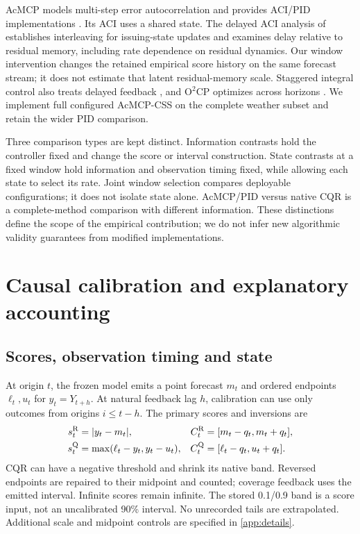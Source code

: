 AcMCP models multi-step error autocorrelation and provides ACI/PID implementations
\citep{wang2026acmcp}. Its ACI uses a shared state. The delayed ACI analysis of
\citet{elhalabi2026delayed} establishes interleaving for issuing-state updates and
examines delay relative to residual memory, including rate dependence on residual
dynamics. Our window intervention changes the retained empirical score history on
the same forecast stream; it does not estimate that latent residual-memory scale.
Staggered integral control also treats delayed feedback \citep{cherenson2026staggered},
and O$^2$CP optimizes across horizons \citep{li2026o2cp}. We implement full configured
AcMCP-CSS on the complete weather subset and retain the wider PID comparison.

Three comparison types are kept distinct. Information contrasts hold the controller
fixed and change the score or interval construction. State contrasts at a fixed window
hold information and observation timing fixed, while allowing each state to select
its rate. Joint window selection compares deployable configurations; it does not
isolate state alone. AcMCP/PID versus native CQR is a complete-method comparison with
different information. These distinctions define the scope of the empirical contribution;
we do not infer new algorithmic validity guarantees from modified implementations.

\section{Causal calibration and explanatory accounting}
\subsection{Scores, observation timing and state}
At origin $t$, the frozen model emits a point forecast $m_t$ and ordered endpoints
$\ell_t,u_t$ for $y_t=Y_{t+h}$. At natural feedback lag $h$, calibration can use only
outcomes from origins $i\leq t-h$. The primary scores and inversions are
\begin{align}
s_t^{\rm R}&=|y_t-m_t|,& C_t^{\rm R}&=[m_t-q_t,m_t+q_t],\\
s_t^{\rm Q}&=\max(\ell_t-y_t,y_t-u_t),&
C_t^{\rm Q}&=[\ell_t-q_t,u_t+q_t].
\end{align}
CQR can have a negative threshold and shrink its native band. Reversed endpoints
are repaired to their midpoint and counted; coverage feedback uses the emitted
interval. Infinite scores remain infinite. The stored 0.1/0.9 band is a score input,
not an uncalibrated 90\% interval. No unrecorded tails are extrapolated. Additional
scale and midpoint controls are specified in \ref{app:details}.

